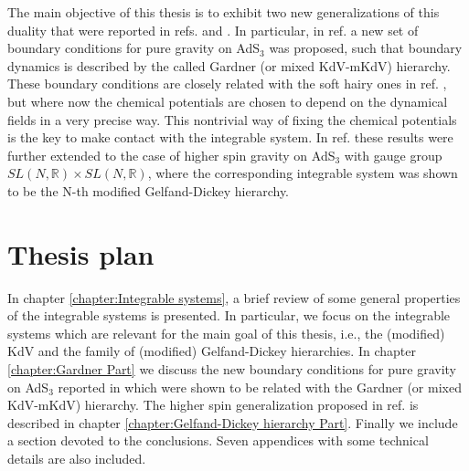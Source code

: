 \documentclass[letterpaper,11pt,oneside]{book}
\begin{document}
The main objective of this thesis is to exhibit two new generalizations of this duality that were reported in refs.\cite{Ojeda:2019xih} and \cite{Ojeda:2020bgz}. In particular, in ref. \cite{Ojeda:2019xih} a new set of boundary conditions for pure gravity on AdS$_3$ was proposed, such that boundary dynamics is described by the called Gardner (or mixed KdV-mKdV) hierarchy. These boundary conditions are closely related with the soft hairy ones in ref. \cite{Afshar:2016wfy}, but where now the chemical potentials are chosen to depend on the dynamical fields in a very precise way. This nontrivial way of fixing the chemical potentials is the key to make contact with the integrable system. In ref. \cite{Ojeda:2020bgz} these results were further extended to the case of higher spin gravity on AdS$_3$ with gauge group $SL\left(N,\mathbb{R}\right)\times SL\left(N,\mathbb{R}\right)$, where the corresponding integrable system was shown to be the N-th modified Gelfand-Dickey hierarchy.

\section*{Thesis plan}

In chapter \ref{chapter:Integrable systems}, a brief review of some general properties of the integrable systems is presented. In particular, we focus on the integrable systems which are relevant for the main goal of this thesis, i.e., the (modified) KdV and the family of (modified) Gelfand-Dickey hierarchies. In chapter \ref{chapter:Gardner Part} we discuss the new boundary conditions for pure gravity on AdS$_3$ reported in \cite{Ojeda:2019xih} which were shown to be related with the Gardner (or mixed KdV-mKdV) hierarchy. The higher spin generalization proposed in ref. \cite{Ojeda:2020bgz} is described in chapter \ref{chapter:Gelfand-Dickey hierarchy Part}. Finally we include a section devoted to the conclusions. Seven appendices with some technical details are also included.


\end{document}
